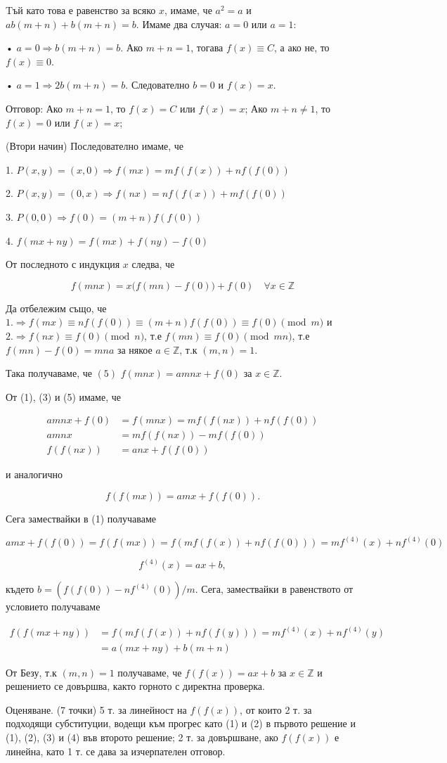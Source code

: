 Tъй като това е равенство за всяко $x$, имаме, че $a^2=a$ и $ab(m+n)+b(m+n)=b$. Имаме два случая: $a=0$ или $a=1$:

• $a=0\Longrightarrow b(m+n)=b$. Ако $m+n=1$, тогава $f(x)\equiv C$, а ако не, то $f(x)\equiv0$.

• $a=1\Longrightarrow2b(m+n)=b$. Следователно $b=0$ и $f(x)=x$.

Отговор: Ако $m+n=1$, то $f(x)=C$ или $f(x)=x$; Ако $m+n\neq1$, то $f(x)=0$ или $f(x)=x$;

(Втори начин) Последователно имаме, че

1. $P(x,y)=(x,0)\Longrightarrow f(mx)=mf(f(x))+nf(f(0))$

2. $P(x,y)=(0,x)\Longrightarrow f(nx)=nf(f(x))+mf(f(0))$

3. $P(0,0)\Longrightarrow f(0)=(m+n)f(f(0))$

4. $f(mx+ny)=f(mx)+f(ny)-f(0)$

От последното с индукция $x$ следва, че

$$f(mnx)=x\big(f(mn)-f(0)\big)+f(0)\quad\forall x\in\mathbb Z$$

Да отбележим също, че $1.\Longrightarrow f(mx)\equiv nf(f(0))\equiv(m+n)f(f(0))\equiv f(0)\pmod m$ и $2.\Longrightarrow f(nx)\equiv f(0)\pmod n$, т.е $f(mn)\equiv f(0)\pmod{mn}$, т.е $f(mn)-f(0)=mna$ за някое $a\in\mathbb Z$, т.к $(m,n)=1$.

Така получаваме, че $(5)$ $f(mnx)=amnx+f(0)$ за $x\in\mathbb Z$.

От (1), (3) и (5) имаме, че

$$\begin{aligned}
amnx+f(0)&=f(mnx)=mf(f(nx))+nf(f(0))\\
amnx&=mf(f(nx))-mf(f(0))\\
f(f(nx))&=anx+f(f(0))
\end{aligned}$$

и аналогично

$$f(f(mx))=amx+f(f(0)).$$

Сега замествайки в (1) получаваме

$$amx+f(f(0))=f(f(mx))=f(mf(f(x))+nf(f(0)))=mf^{(4)}(x)+nf^{(4)}(0)$$

$$f^{(4)}(x)=ax+b,$$

където $b=(f(f(0))-nf^{(4)}(0))/m$. Сега, замествайки в равенството от условието получаваме

$$\begin{aligned}
f(f(mx+ny))&=f(mf(f(x))+nf(f(y)))=mf^{(4)}(x)+nf^{(4)}(y)\\
&=a(mx+ny)+b(m+n)
\end{aligned}$$

От Безу, т.к $(m,n)=1$ получаваме, че $f(f(x))=ax+b$ за $x\in\mathbb Z$ и решението се довършва, както горното с директна проверка.

Оценяване. (7 точки) 5 т. за линейност на $f(f(x))$, от които 2 т. за подходящи субституции, водещи към прогрес като (1) и (2) в първото решение и (1), (2), (3) и (4) във второто решение; 2 т. за довършване, ако $f(f(x))$ е линейна, като 1 т. се дава за изчерпателен отговор.
